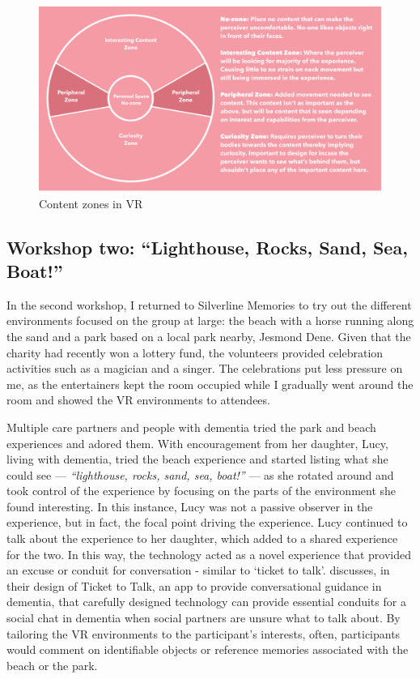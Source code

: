 \begin{figure}[htp]
\centering
\includegraphics[width=.8\linewidth]{Images/ChapterFour/ContentZones.png}
\caption{Content zones in VR}
\label{fig:ContentZone}
\end{figure}

\subsection{Workshop two: ``Lighthouse, Rocks, Sand, Sea, Boat!''}
\label{StudyOne:WorkshopTwo}
In the second workshop, I returned to Silverline Memories to try out the different environments focused on the group at large: the beach with a horse running along the sand and a park based on a local park nearby, Jesmond Dene. Given that the charity had recently won a lottery fund, the volunteers provided celebration activities such as a magician and a singer. The celebrations put less pressure on me, as the entertainers kept the room occupied while I gradually went around the room and showed the VR environments to attendees. 

Multiple care partners and people with dementia tried the park and beach experiences and adored them. With encouragement from her daughter, Lucy, living with dementia, tried the beach experience and started listing what she could see — \textit{``lighthouse, rocks, sand, sea, boat!''} — as she rotated around and took control of the experience by focusing on the parts of the environment she found interesting. In this instance, Lucy was not a passive observer in the experience, but in fact, the focal point driving the experience. Lucy continued to talk about the experience to her daughter, which added to a shared experience for the two. In this way, the technology acted as a novel experience that provided an excuse or conduit for conversation - similar to `ticket to talk'. \cite{welsh_ticket_2018} discusses, in their design of Ticket to Talk, an app to provide conversational guidance in dementia, that carefully designed technology can provide essential conduits for a social chat in dementia when social partners are unsure what to talk about. By tailoring the VR environments to the participant's interests, often, participants would comment on identifiable objects or reference memories associated with the beach or the park.

